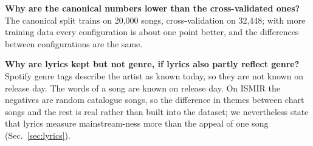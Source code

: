 \textbf{Why are the canonical numbers lower than the cross-validated ones?} The canonical split trains on
20{,}000 songs, cross-validation on 32{,}448; with more training data every configuration is about one point
better, and the differences between configurations are the same.

\textbf{Why are lyrics kept but not genre, if lyrics also partly reflect genre?} Spotify genre tags
describe the artist as known today, so they are not known on release day.
The words of a song are known on release day. On ISMIR the negatives are random catalogue songs, so the
difference in themes between chart songs and the rest is real rather than built into the dataset; we
nevertheless state that lyrics measure mainstream-ness more than the appeal of one song
(Sec.~\ref{sec:lyrics}).
